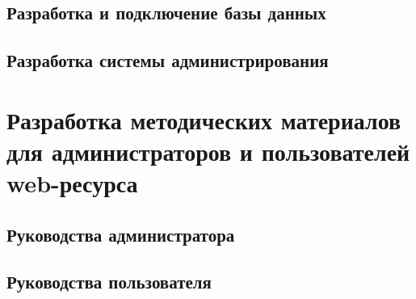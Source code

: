     \subsection{Разработка и подключение базы данных}
    \subsection{Разработка системы администрирования}

\section{Разработка методических материалов для администраторов и пользователей web-ресурса}
    \subsection{Руководства администратора}
    \subsection{Руководства пользователя}

\clearpage
